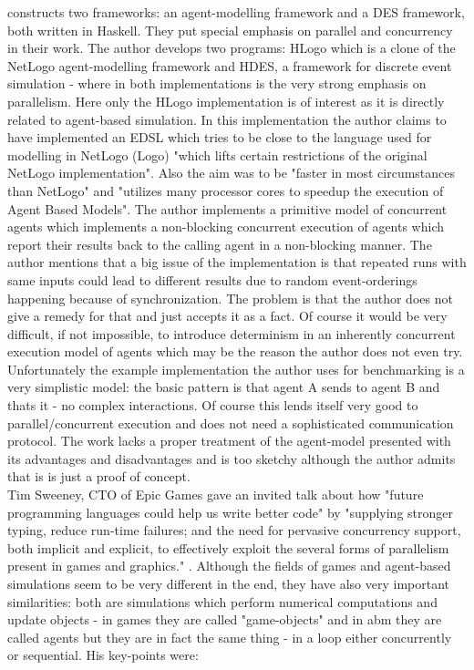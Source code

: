 \cite{bezirgiannis_improving_2013} constructs two frameworks: an agent-modelling framework and a DES framework, both written in Haskell. They put special emphasis on parallel and concurrency in their work. The author develops two programs: HLogo which is a clone of the NetLogo agent-modelling framework and HDES, a framework for discrete event simulation - where in both implementations is the very strong emphasis on parallelism.  Here only the HLogo implementation is of interest as it is directly related to agent-based simulation. In this implementation the author claims to have implemented an EDSL which tries to be close to the language used for modelling in NetLogo (Logo) "which lifts certain restrictions of the original NetLogo implementation". Also the aim was to be "faster in most circumstances than NetLogo" and "utilizes many processor cores to speedup the execution of Agent Based Models". The author implements a primitive model of concurrent agents which implements a non-blocking concurrent execution of agents which report their results back to the calling agent in a non-blocking manner. The author mentions that a big issue of the implementation is that repeated runs with same inputs could lead to different results due to random event-orderings happening because of synchronization. The problem is that the author does not give a remedy for that and just accepts it as a fact. Of course it would be very difficult, if not impossible, to introduce determinism in an inherently concurrent execution model of agents which may be the reason the author does not even try. Unfortunately the example implementation the author uses for benchmarking is a very simplistic model: the basic pattern is that agent A sends to agent B and thats it - no complex interactions. Of course this lends itself very good to parallel/concurrent execution and does not need a sophisticated communication protocol. The work lacks a proper treatment of the agent-model presented with its advantages and disadvantages and is too sketchy although the author admits that is is just a proof of concept. \\

Tim Sweeney, CTO of Epic Games gave an invited talk about how "future programming languages could help us write better code" by "supplying stronger typing, reduce run-time failures;  and the need for pervasive concurrency support, both implicit and explicit, to effectively exploit the several forms of parallelism present in games and graphics." \cite{sweeney_next_2006}. Although the fields of games and agent-based simulations seem to be very different in the end, they have also very important similarities: both are simulations which perform numerical computations and update objects - in games they are called "game-objects" and in abm they are called agents but they are in fact the same thing - in a loop either concurrently or sequential. His key-points were:

